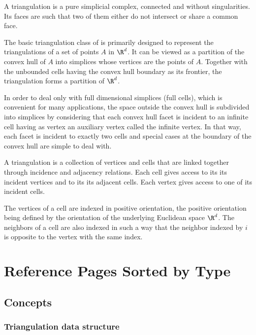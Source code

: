 


A triangulation is a pure simplicial complex, connected and without
singularities. Its faces are such that two of them either do not
intersect or share a common face.

The basic triangulation class of \cgal is primarily designed to
represent the triangulations of a set of points $A$ in $\R^d$.
 It can be
viewed as a partition of the convex hull of $A$ into simplices whose
vertices are the points of $A$. Together with the unbounded cells having
the convex hull boundary as its frontier, the triangulation forms a
partition of $\R^d$.

In order to deal only with full dimensional simplices (full cells),
 which is convenient for many
applications, the space outside the convex hull is subdivided into simplices by
considering that each convex hull facet is incident to an infinite
cell having as vertex an auxiliary vertex called the infinite
vertex. In that way, each facet is incident to exactly two cells and
special cases at the boundary of the convex hull are simple to deal
with. 

A triangulation is a collection of vertices and cells that are linked
together through incidence and adjacency relations. Each cell gives
access to its its incident vertices and to its its adjacent
cells. Each vertex gives access to one of its incident cells. 

The vertices of a cell are indexed in positive
orientation, the positive orientation being defined by the orientation
of the underlying Euclidean space $\R^d$. The neighbors of a cell are also
indexed  in such a way that the neighbor indexed by $i$
is opposite to the vertex with the same index.



\section{Reference Pages Sorted by Type}

\subsection{Concepts}

\subsubsection*{Triangulation data structure}

